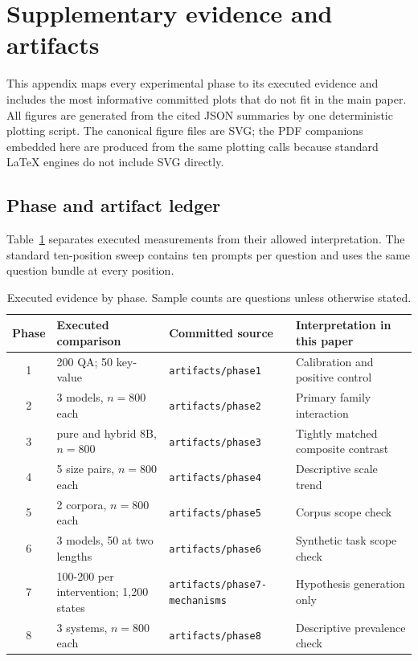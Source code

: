 \documentclass{article}
\begin{document}
\appendix

\section{Supplementary evidence and artifacts}
\label{app:artifacts}

This appendix maps every experimental phase to its executed evidence and includes the most informative committed plots that do not fit in the main paper.
All figures are generated from the cited JSON summaries by one deterministic plotting script.
The canonical figure files are SVG; the PDF companions embedded here are produced from the same plotting calls because standard \LaTeX{} engines do not include SVG directly.

\subsection{Phase and artifact ledger}

Table~\ref{tab:phase-ledger} separates executed measurements from their allowed interpretation.
The standard ten-position sweep contains ten prompts per question and uses the same question bundle at every position.

\begin{table}[t]
\caption{Executed evidence by phase.
Sample counts are questions unless otherwise stated.}
\label{tab:phase-ledger}
\centering
\scriptsize
\setlength{\tabcolsep}{5.5pt}
\begin{tabular}{@{}clll@{}}
\toprule
Phase & Executed comparison & Committed source & Interpretation in this paper \\
\midrule
1 & 200 QA; 50 key-value & \texttt{artifacts/phase1} & Calibration and positive control \\
2 & 3 models, $n=800$ each & \texttt{artifacts/phase2} & Primary family interaction \\
3 & pure and hybrid 8B, $n=800$ & \texttt{artifacts/phase3} & Tightly matched composite contrast \\
4 & 5 size pairs, $n=800$ each & \texttt{artifacts/phase4} & Descriptive scale trend \\
5 & 2 corpora, $n=800$ each & \texttt{artifacts/phase5} & Corpus scope check \\
6 & 3 models, 50 at two lengths & \texttt{artifacts/phase6} & Synthetic task scope check \\
7 & 100-200 per intervention; 1,200 states & \texttt{artifacts/phase7-mechanisms} & Hypothesis generation only \\
8 & 3 systems, $n=800$ each & \texttt{artifacts/phase8} & Descriptive prevalence check \\
\bottomrule
\end{tabular}
\end{table}
\end{document}
